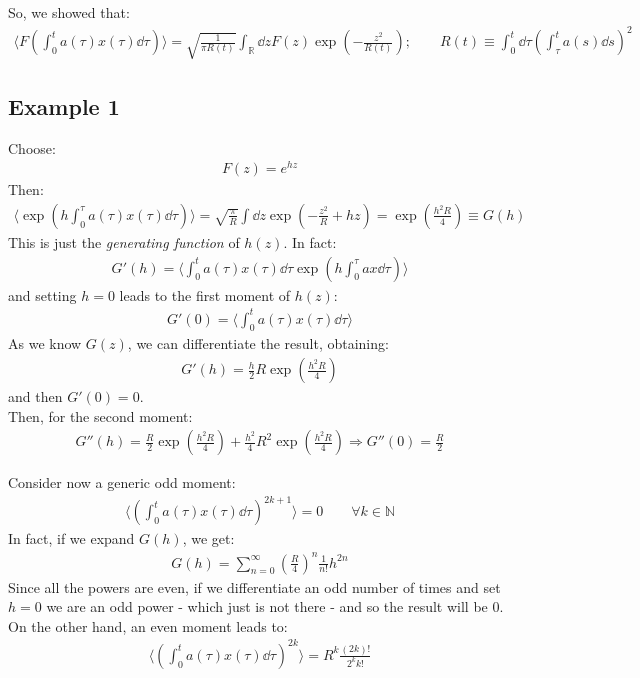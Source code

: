 \documentclass[../template.tex]{subfiles}
\begin{document}
So, we showed that:
\begin{align*}
    \langle F\left(\int_0^t a(\tau) x(\tau)\dd{\tau}\right) \rangle = \sqrt{\frac{1}{ \pi R(t)} } \int_{\mathbb{R}} \dd{z} F(z) \exp\left(-\frac{z^2}{R(t)} \right); \qquad R(t) \equiv \int_0^t \dd{\tau}\left(\int_\tau^t a(s) \dd{s}\right)^2
\end{align*}

\subsection{Example 1} 
Choose:
\begin{align*}
    F(z) = e^{hz}
\end{align*} 
Then:
\begin{align*}
    \langle \exp\left(h \int_0^\tau a(\tau) x(\tau) \dd{\tau}\right) \rangle = \sqrt{\frac{\pi}{R} } \int \dd{z} \exp\left(-\frac{z^2}{R} + hz \right) = \exp\left(\frac{h^2 R}{4} \right) \equiv G(h)
\end{align*}
This is just the \textit{generating function} of $h(z)$. In fact: 
\begin{align*}
    G'(h) = \langle \int_0^t a(\tau) x(\tau) \dd{\tau} \exp\left(h \int_0^\tau a x \dd{\tau}\right) \rangle
\end{align*}
and setting $h = 0$ leads to the first moment of $h(z)$:
\begin{align*}
    G'(0) = \langle \int_0^t a(\tau) x(\tau) \dd{\tau} \rangle
\end{align*}  
As we know $G(z)$, we can differentiate the result, obtaining:
\begin{align*}
    G'(h) = \frac{h}{2} R \exp\left(\frac{h^2 R}{4} \right) 
\end{align*} 
and then $G'(0) = 0$.\\
Then, for the second moment:
\begin{align*}
    G''(h) = \frac{R}{2} \exp\left(\frac{h^2 R}{4} \right) + \frac{h^2}{4} R^2 \exp\left(\frac{h^2 R}{4} \right) \Rightarrow G''(0) = \frac{R}{2}  
\end{align*} 

Consider now a generic odd moment:
\begin{align*}
    \langle \left(\int_0^t a(\tau)x(\tau) \dd{\tau}\right)^{2k+1} \rangle = 0 \qquad \forall k \in \mathbb{N}
\end{align*}
In fact, if we expand $G(h)$, we get:
\begin{align*}
    G(h) = \sum_{n=0}^\infty
 \left(\frac{R}{4} \right)^n \frac{1}{n!} h^{2n} \end{align*}
Since all the powers are even, if we differentiate an odd number of times and set $h=0$ we are  an odd power - which just is not there - and so the result will be $0$.\\
On the other hand, an even moment leads to:
\begin{align*}
    \langle \left(\int_0^t a(\tau) x(\tau) \dd{\tau}\right)^{2k} \rangle = R^{k} \frac{(2k)!}{2^{k} k!} 
\end{align*}
\end{document}

